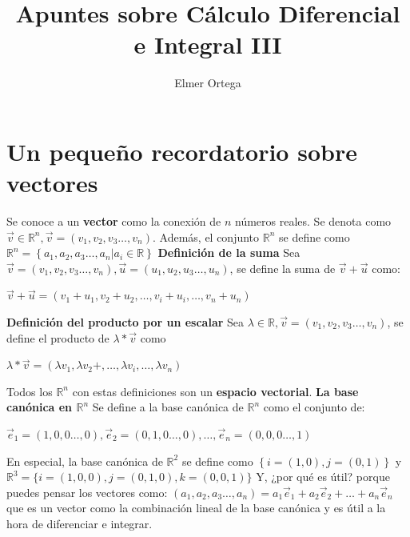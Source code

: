 \documentclass[12pt]{article}
\begin{document}
\title{Apuntes sobre Cálculo Diferencial e Integral III}
\author{Elmer Ortega}
\maketitle
\noindent\section*{Un pequeño recordatorio sobre vectores}
Se conoce a un \textbf{vector} como la conexión de $n$ números 
reales. Se denota como $\vec{v}\in\mathbb{R}^n, \vec{v}=\left(v_1,v_2,v_3\dots,v_n\right)$. 
Además, el conjunto $\mathbb{R}^n$ se define como $\mathbb{R}^n=\left\{a_1,a_2,a_3\dots,a_n | a_i\in\mathbb{R}\right\}$
\newline
\newline
\textbf{Definición de la suma}\newline
Sea $\vec{v}=\left(v_1,v_2,v_3\dots,v_n\right), \vec{u}=\left(u_1,u_2,u_3\dots,u_n\right)$, se define la suma de $\vec{v}+\vec{u}$ como:
\begin{center}
    $\vec{v}+\vec{u}=\left(v_1+u_1,v_2+u_2,\dots,v_i+u_i,\dots,v_n+u_n\right)$
\end{center}
\textbf{Definición del producto por un escalar}\newline
Sea $\lambda\in\mathbb{R},\vec{v}=\left(v_1,v_2,v_3\dots,v_n\right)$, se define el producto de $\lambda*\vec{v}$ como
\begin{center}
    $\lambda*\vec{v}=\left(\lambda v_1, \lambda v_2+,\dots,\lambda v_i,\dots,\lambda v_n\right)$
\end{center}
Todos los $\mathbb{R}^n$ con estas definiciones son un \textbf{espacio vectorial}.
\newline
\textbf{La base canónica en $\mathbb{R}^n$}\newline
Se define a la base canónica de $\mathbb{R}^n$ como el conjunto de:
\begin{center}
    $\vec{e}_1=\left(1,0,0\dots,0\right), \vec{e}_2=\left(0,1,0\dots,0\right), \dots, \vec{e}_n=\left(0,0,0\dots,1\right)$
\end{center}
En especial, la base canónica de $\mathbb{R}^2$ se define como $\left\{i=(1,0),j=(0,1)\right\}$ y $\mathbb{R}^3=\{i=(1,0,0), j=(0,1,0),k=(0,0,1)\}$
Y, ¿por qué es útil? porque puedes pensar los vectores como: 
$\left(a_1,a_2,a_3\dots,a_n\right)=a_1\vec{e}_1+a_2\vec{e}_2+\dots+a_n\vec{e}_n$ 
que es un vector como la combinación lineal de la base canónica y es útil a la hora de diferenciar e integrar.
\newpage
\end{document}
